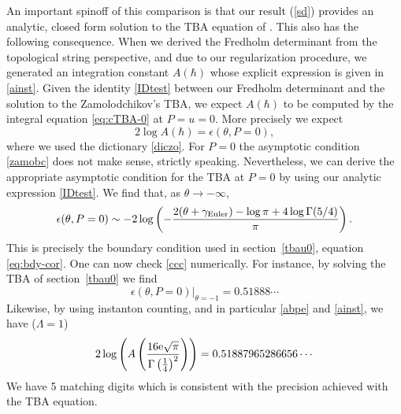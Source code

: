 \documentclass[a4paper,11pt]{article}
\theoremstyle{definition}
\newcommand{\re}{{\rm e}}
\newcommand{\be}{\begin{equation}}
\newcommand{\ee}{\end{equation}}
\begin{document}
 An important spinoff of this comparison is that our result (\ref{sd})
 provides an analytic, closed form solution to the TBA equation of
 \cite{post-zamo}. This also has the following consequence.  When we
 derived the Fredholm determinant from the topological string
 perspective, and due to our regularization procedure, we generated an
 integration constant $A(\hbar)$ whose explicit expression is given in
 \eqref{ainst}.  Given the identity \eqref{IDtest} between our
 Fredholm determinant and the solution to the Zamolodchikov's TBA, we
 expect $A(\hbar)$ to be computed by the integral equation \eqref{eq:cTBA-0} at
 $P=u=0$.  More precisely we expect
%
\be \label{ccc} 2 \log A(\hbar) = \epsilon(\theta, P=0),
\ee
% 
where we used the dictionary \eqref{diczo}.  For $P=0$ the asymptotic
condition \eqref{zamobc} does not make sense, strictly speaking.
Nevertheless, we can derive the appropriate asymptotic condition for
the TBA at $P=0$ by using our analytic expression \eqref{IDtest}.  We
find that, as $\theta \rightarrow -\infty$,
%
%
\begin{equation}\label{eps0}
  \epsilon(\theta, P=0) 
  \sim -2 \log \left(
    -\frac{2 (\theta +\gamma_{\rm Euler} )-\log \pi+4 \log\Gamma(5/4)}{\pi}
  \right).
\end{equation}
%
 This is precisely the boundary condition used in section~\ref{tbau0}, equation \eqref{eq:bdy-cor}. 
 One can now check \eqref{ccc} numerically.
  For instance, by solving the TBA of  section~\ref{tbau0} we find
 \be \epsilon(\theta,P=0)\Big|_{\theta=-1}=0.51888\cdots 
 \ee
 Likewise, by using instanton counting, and in particular \eqref{abpe} and \eqref{ainst}, we have ($\Lambda=1$)
 \be 2 \log\left(A \left(\frac{16 \re \sqrt{\pi }}{\Gamma \left(\frac{1}{4}\right)^2}\right)\right)=0.51887965286656 \cdots
 \ee
We have 5 matching digits which is consistent with the precision achieved with the TBA equation.
\end{document}
